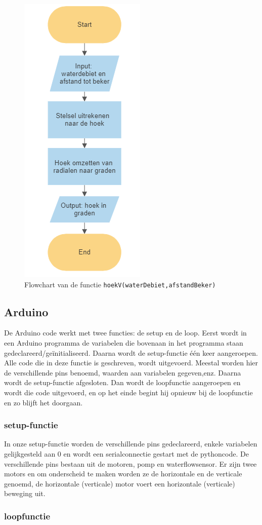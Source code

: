 \documentclass[kulak]{kulakarticle} %
\begin{document}
				\begin{figure} [h!]
					\centering
					\includegraphics[width = .2 \textwidth]{flowchart_hoekV}
				\cprotect\caption{Flowchart van de functie \verb*|hoekV(waterDebiet,afstandBeker)|}
					\label{flowchart_water}
				\end{figure}


	\subsection{Arduino}
	
		De Arduino code werkt met twee functies: de setup en de loop. Eerst wordt in een Arduino programma de variabelen die bovenaan in het programma staan gedeclareerd/geïnitialiseerd. Daarna wordt de setup-functie één keer aangeroepen. Alle code die in deze functie is geschreven, wordt uitgevoerd. Meestal worden hier de verschillende pins benoemd, waarden aan variabelen gegeven,enz. Daarna wordt de setup-functie afgesloten. Dan wordt de loopfunctie aangeroepen en wordt die code uitgevoerd, en op het einde begint hij opnieuw bij de loopfunctie en zo blijft het doorgaan.
		
		
		\subsubsection{setup-functie}
			In onze setup-functie worden de verschillende pins gedeclareerd, enkele variabelen gelijkgesteld aan 0 en wordt een serialconnectie gestart met de pythoncode. De verschillende pins bestaan uit de motoren, pomp en waterflowsensor. Er zijn twee motors en om onderscheid te maken worden ze de horizontale en de verticale genoemd, de horizontale (verticale) motor voert een horizontale (verticale) beweging uit.
			
			
		\subsubsection{loopfunctie}
		
\end{document}
